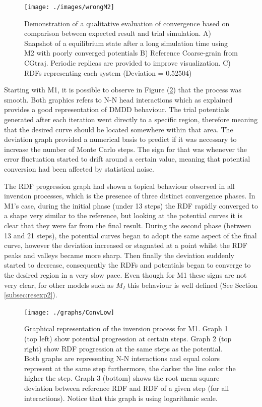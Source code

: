 \documentclass[10pt,a4paper,twoside]{article}
\begin{document}
\begin{figure}[ht!]
  \begin{center}
	\texttt{[image: ./images/wrongM2]}
	\caption{Demonstration of a qualitative evaluation of convergence based on comparison between expected result and trial simulation. A) Snapshot of a equilibrium state after a long simulation time using M2 with poorly converged potentials B) Reference Coarse-grain from CGtraj. Periodic replicas are provided to improve visualization. C) RDFs representing each system (Deviation  = 0.52504)}
	\label{Fig:wrong}
  \end{center}
\end{figure}

 Starting with M1, it is possible to observe in Figure (\ref{Fig:convM1}) that the process was smooth. Both graphics refers to N-N head interactions which as explained provides a good representation of DMDD behaviour. The trial potentials generated after each iteration went directly to a specific region, therefore meaning that the desired curve should be located somewhere within that area. The deviation graph provided a numerical basis to predict if it was necessary to increase the number of Monte Carlo steps. The sign for that was whenever the error fluctuation started to drift around a certain value, meaning that potential conversion had been affected by statistical noise.

The RDF progression graph had shown a topical behaviour observed in all inversion processes, which is the presence of three distinct convergence phases. In M1's case, during the initial phase (under 13 steps) the RDF rapidly converged to a shape very similar to the reference, but looking at the potential curves it is clear that they were far from the final result. During the second phase (between 13 and 21 steps), the potential curves began to adopt the same aspect of the final curve, however the deviation increased or stagnated at a point whilst the RDF peaks and valleys became more sharp. Then finally the deviation suddenly started to decrease, consequently the RDFs and potentials began to converge to the desired region in a very slow pace. Even though for M1 these signs are not very clear, for other models such as $M_{I}$ this behaviour is well defined (See Section \ref{subsec:resexp2}).

\begin{figure}[H]
  \begin{center}
	\texttt{[image: ./graphs/ConvLow]}
	\caption{\small{Graphical representation of the inversion process for M1. Graph 1 (top left) show potential progression at certain steps. Graph 2 (top right) show RDF progression at the same steps as the potential. Both graphs are representing N-N interactions and equal colors represent at the same step furthermore, the darker the line color the higher the step. Graph 3 (bottom) shows the root mean square deviation between reference RDF and RDF of a given step (for all interactions). Notice that this graph is using logarithmic scale.}}
	\label{Fig:convM1}
  \end{center}
\end{figure} 
\end{document}
